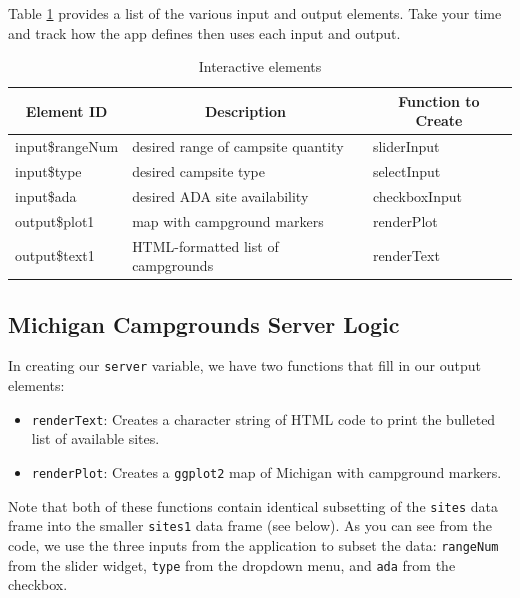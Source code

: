 \documentclass[12pt,oneside]{book}\usepackage[]{graphicx}\usepackage[]{color}
\begin{document}
Table \ref{table:els} provides a list of the various input and output elements.  Take your time and track how the app defines then uses each input and output.
\begin{table}[]
\centering
\caption{Interactive elements}
\label{table:els}
\begin{tabular}{lll}
\hline
\multicolumn{1}{c}{\textbf{Element ID}} & \multicolumn{1}{c}{\textbf{Description}} & \multicolumn{1}{c}{\textbf{Function to Create}} \\ \hline
input\$rangeNum                         & desired range of campsite quantity       & sliderInput                                     \\
input\$type                             & desired campsite type                    & selectInput                                     \\
input\$ada                              & desired ADA site availability            & checkboxInput                                   \\
output\$plot1                           & map with campground markers              & renderPlot                                      \\
output\$text1                           & HTML-formatted list of campgrounds       & renderText                                      \\ \hline
\end{tabular}
\end{table}

\subsection{Michigan Campgrounds Server Logic}

In creating our \verb+server+ variable, we have two functions that fill in our output elements:

\begin{itemize}
\item \verb+renderText+: Creates a character string of HTML code to print the bulleted list of available sites.
\item \verb+renderPlot+: Creates a \verb+ggplot2+ map of Michigan with campground markers.
\end{itemize}

Note that both of these functions contain identical subsetting of the \verb+sites+ data frame into the smaller \verb+sites1+ data frame (see below). As you can see from the code, we use the three inputs from the application to subset the data: \verb+rangeNum+ from the slider widget, \verb+type+ from the dropdown menu, and \verb+ada+ from the checkbox.
\end{document}
